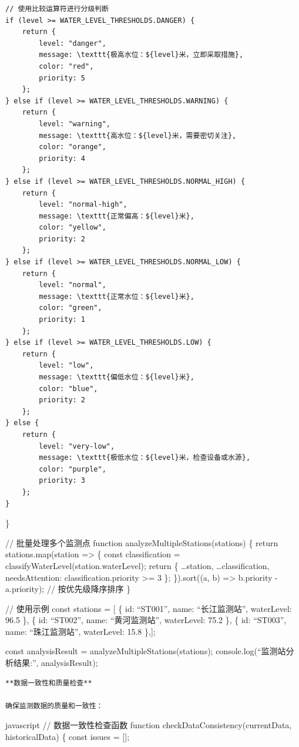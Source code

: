 \begin{verbatim}
// 使用比较运算符进行分级判断
if (level >= WATER_LEVEL_THRESHOLDS.DANGER) {
    return { 
        level: "danger", 
        message: \texttt{极高水位：${level}米，立即采取措施},
        color: "red",
        priority: 5 
    };
} else if (level >= WATER_LEVEL_THRESHOLDS.WARNING) {
    return { 
        level: "warning", 
        message: \texttt{高水位：${level}米，需要密切关注},
        color: "orange", 
        priority: 4
    };
} else if (level >= WATER_LEVEL_THRESHOLDS.NORMAL_HIGH) {
    return { 
        level: "normal-high", 
        message: \texttt{正常偏高：${level}米},
        color: "yellow",
        priority: 2 
    };
} else if (level >= WATER_LEVEL_THRESHOLDS.NORMAL_LOW) {
    return { 
        level: "normal", 
        message: \texttt{正常水位：${level}米},
        color: "green",
        priority: 1 
    };
} else if (level >= WATER_LEVEL_THRESHOLDS.LOW) {
    return { 
        level: "low", 
        message: \texttt{偏低水位：${level}米},
        color: "blue",
        priority: 2 
    };
} else {
    return { 
        level: "very-low", 
        message: \texttt{极低水位：${level}米，检查设备或水源},
        color: "purple",
        priority: 3 
    };
}
\end{verbatim}

\}

// 批量处理多个监测点 function analyzeMultipleStations(stations) \{ return stations.map(station =\textgreater{} \{ const classification = classifyWaterLevel(station.waterLevel); return \{ \ldots station, \ldots classification, needsAttention: classification.priority \textgreater= 3 \}; \}).sort((a, b) =\textgreater{} b.priority - a.priority); // 按优先级降序排序 \}

// 使用示例 const stations = {[} \{ id: ``ST001'', name: ``长江监测站'', waterLevel: 96.5 \}, \{ id: ``ST002'', name: ``黄河监测站'', waterLevel: 75.2 \}, \{ id: ``ST003'', name: ``珠江监测站'', waterLevel: 15.8 \},{]};

const analysisResult = analyzeMultipleStations(stations); console.log(``监测站分析结果:'', analysisResult);

\begin{lstlisting}
**数据一致性和质量检查**

确保监测数据的质量和一致性：
\end{lstlisting}

javascript // 数据一致性检查函数 function checkDataConsistency(currentData, historicalData) \{ const issues = {[}{]};

